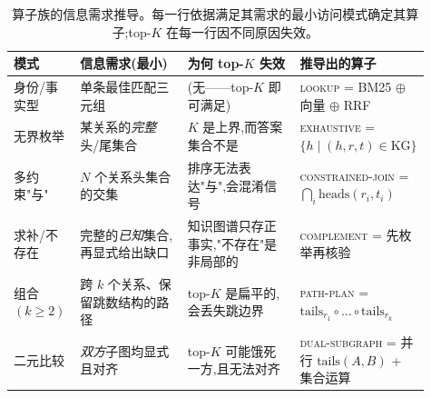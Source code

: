 \documentclass[11pt,a4paper]{article}
\newcommand{\op}[1]{\textsc{\small #1}}
\begin{document}
\begin{table}[t]
\centering\small
\caption{算子族的信息需求推导。每一行依据满足其需求的最小访问模式确定其算子;top-$K$ 在每一行因不同原因失效。}
\label{tab:reqs}
\setlength{\tabcolsep}{4pt}
\begin{tabular}{p{0.16\linewidth} p{0.27\linewidth} p{0.28\linewidth} p{0.20\linewidth}}
\toprule
\textbf{模式} & \textbf{信息需求(最小)} & \textbf{为何 top-$K$ 失效} & \textbf{推导出的算子} \\
\midrule
身份/事实型     & 单条最佳匹配三元组                       & (无——top-$K$ 即可满足)                       & \op{lookup} = BM25 $\oplus$ 向量 $\oplus$ RRF \\
无界枚举        & 某关系的\emph{完整}头/尾集合             & $K$ 是上界,而答案集合不是                     & \op{exhaustive} = $\{h \mid (h,r,t)\!\in\!\text{KG}\}$ \\
多约束"与"      & $N$ 个关系头集合的交集                    & 排序无法表达"与",会混淆信号                   & \op{constrained-join} = $\bigcap_i \text{heads}(r_i,t_i)$ \\
求补/不存在     & 完整的\emph{已知}集合,再显式给出缺口      & 知识图谱只存正事实,"不存在"是非局部的         & \op{complement} = 先枚举再核验 \\
组合 $(k\!\geq\!2)$ & 跨 $k$ 个关系、保留跳数结构的路径    & top-$K$ 是扁平的,会丢失跳边界                 & \op{path-plan} = $\text{tails}_{r_1}\!\circ\!\dots\!\circ\!\text{tails}_{r_k}$ \\
二元比较        & \emph{双方}子图均显式且对齐              & top-$K$ 可能饿死一方,且无法对齐               & \op{dual-subgraph} = 并行 $\text{tails}(A,B)$ + 集合运算 \\
\bottomrule
\end{tabular}
\end{table}
\end{document}
